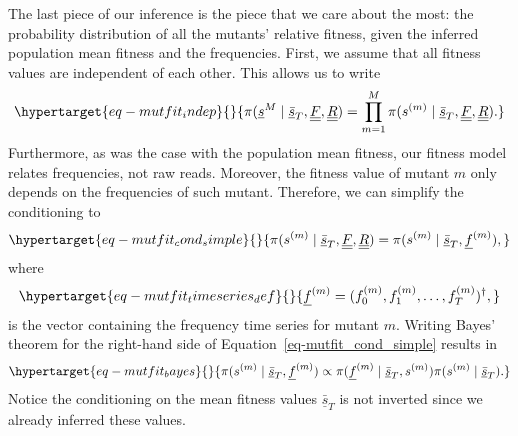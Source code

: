 \documentclass[
  letterpaper,
  DIV=11,
  numbers=noendperiod]{scrartcl}
\begin{document}
\begin{refsegment}
The last piece of our inference is the piece that we care about the
most: the probability distribution of all the mutants' relative fitness,
given the inferred population mean fitness and the frequencies. First,
we assume that all fitness values are independent of each other. This
allows us to write
\begin{equation}\protect\hypertarget{eq-mutfit_indep}{}{
\pi(
    \underline{s}^M \mid 
    \underline{\bar{s}}_T, \underline{\underline{F}}, \underline{\underline{R}}
) = 
\prod_{m=1}^M \pi(
    s^{(m)} \mid
    \underline{\bar{s}}_T, \underline{\underline{F}}, \underline{\underline{R}}
).
}\label{eq-mutfit_indep}\end{equation} Furthermore, as was the case with
the population mean fitness, our fitness model relates frequencies, not
raw reads. Moreover, the fitness value of mutant \(m\) only depends on
the frequencies of such mutant. Therefore, we can simplify the
conditioning to
\begin{equation}\protect\hypertarget{eq-mutfit_cond_simple}{}{
\pi(
    s^{(m)} \mid
    \underline{\bar{s}}_T, \underline{\underline{F}}, \underline{\underline{R}}
) = 
\pi(s^{(m)} \mid \underline{\bar{s}}_T, \underline{f}^{(m)}),
}\label{eq-mutfit_cond_simple}\end{equation} where
\begin{equation}\protect\hypertarget{eq-mutfit_timeseries_def}{}{
\underline{f}^{(m)} = (f_0^{(m)}, f_1^{(m)}, \ldots, f_T^{(m)})^\dagger,
}\label{eq-mutfit_timeseries_def}\end{equation} is the vector containing
the frequency time series for mutant \(m\). Writing Bayes' theorem for
the right-hand side of Equation~\ref{eq-mutfit_cond_simple} results in
\begin{equation}\protect\hypertarget{eq-mutfit_bayes}{}{
\pi(s^{(m)} \mid \underline{\bar{s}}_T, \underline{f}^{(m)}) \propto
\pi(\underline{f}^{(m)} \mid \underline{\bar{s}}_T, s^{(m)})
\pi(s^{(m)} \mid \underline{\bar{s}}_T).
}\label{eq-mutfit_bayes}\end{equation} Notice the conditioning on the
mean fitness values \(\underline{\bar{s}}_T\) is not inverted since we
already inferred these values.


\end{refsegment}
\end{document}
